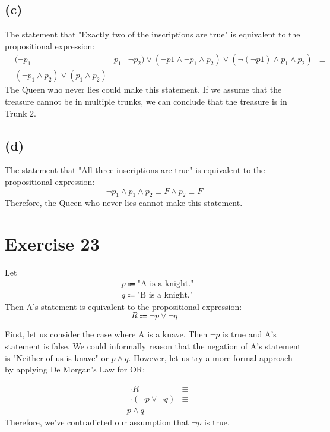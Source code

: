 \documentclass{article}
\begin{document}
\subsection{(c)}
The statement that "Exactly two of the inscriptions are true" is equivalent to the propositional expression:
\begin{align*}
	 & (\neg p_1                                 & p_1 & \neg p_2) \lor (\neg p1 \land \neg p_1 \land p_2) \lor (\neg (\neg p1) \land p_1 \land p_2) & \equiv \\
	 & (\neg p_1 \land p_2) \lor (p_1 \land p_2)
\end{align*}
The Queen who never lies could make this statement. If we assume that the treasure cannot be in multiple trunks, we can conclude that the treasure is in Trunk 2.

\subsection{(d)}
The statement that "All three inscriptions are true" is equivalent to the propositional expression:
\[
	\neg p_1 \land p_1 \land p_2 \equiv F \land p_2 \equiv F
\]
Therefore, the Queen who never lies cannot make this statement.

\pagebreak

\section{Exercise 23}
Let
\begin{align*}
	 & p \Coloneqq \text{"A is a knight."} \\
	 & q \Coloneqq \text{"B is a knight."}
\end{align*}
Then A's statement is equivalent to the propositional expression:
\[
	R \Coloneqq \neg p \lor \neg q
\]

First, let us consider the case where A is a knave. Then $\neg p$ is true and A's statement is false. We could informally reason that the negation of A's statement is "Neither of us is knave" or $p \land q$. However, let us try a more formal approach by applying De Morgan's Law for OR:

\begin{align*}
	 & \neg R                    & \equiv \\
	 & \neg (\neg p \lor \neg q) & \equiv \\
	 & p \land q
\end{align*}
Therefore, we've contradicted our assumption that $\neg p$ is true.
\end{document}
